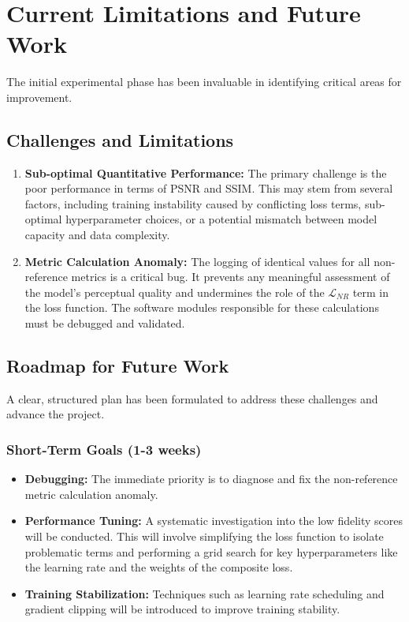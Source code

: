 \documentclass[10pt,twocolumn,letterpaper]{article}
\begin{document}
\section{Current Limitations and Future Work}
The initial experimental phase has been invaluable in identifying critical areas for improvement.

\subsection{Challenges and Limitations}
\begin{enumerate}
    \item \textbf{Sub-optimal Quantitative Performance:} The primary challenge is the poor performance in terms of PSNR and SSIM. This may stem from several factors, including training instability caused by conflicting loss terms, sub-optimal hyperparameter choices, or a potential mismatch between model capacity and data complexity.
    \item \textbf{Metric Calculation Anomaly:} The logging of identical values for all non-reference metrics is a critical bug. It prevents any meaningful assessment of the model's perceptual quality and undermines the role of the $\mathcal{L}_{NR}$ term in the loss function. The software modules responsible for these calculations must be debugged and validated.
\end{enumerate}

\subsection{Roadmap for Future Work}
A clear, structured plan has been formulated to address these challenges and advance the project.

\subsubsection{Short-Term Goals (1-3 weeks)}
\begin{itemize}
    \item \textbf{Debugging:} The immediate priority is to diagnose and fix the non-reference metric calculation anomaly.
    \item \textbf{Performance Tuning:} A systematic investigation into the low fidelity scores will be conducted. This will involve simplifying the loss function to isolate problematic terms and performing a grid search for key hyperparameters like the learning rate and the weights of the composite loss.
    \item \textbf{Training Stabilization:} Techniques such as learning rate scheduling and gradient clipping will be introduced to improve training stability.
\end{itemize}
\end{document}
